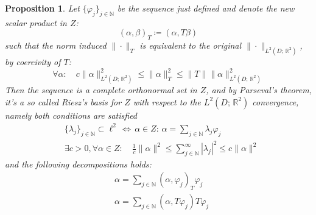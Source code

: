 \documentclass[10pt, a4paper, twoside, openright]{book}
\theoremstyle{definition}
\theoremstyle{plain}
\theoremstyle{plain}
\theoremstyle{plain}
\newtheorem{proposition}[subsection]{Proposition}
\theoremstyle{plain}
\theoremstyle{plain}
\theoremstyle{plain}
\theoremstyle{plain}
\theoremstyle{plain}
\let\phi\varphi
\begin{document}
\begin{proposition}
 Let $\{\phi_j\}_{j\in\mathbb{N}}$ be the sequence just defined and denote the new scalar product in $Z$:
 \begin{equation}
   ( \alpha, \beta )_T \coloneqq ( \alpha , T\beta)   
 \end{equation}
 such that the norm induced $\|\cdot\|_T$ is equivalent to the original $\|\cdot\|_{L^2(D;\,\mathbb{R}^2)}$, by coercivity of $T$: 
  \begin{equation}
   \forall \alpha:\quad c\|\alpha\|_{L^2(D;\,\mathbb{R}^2)}^2\leq \|\alpha\|_T^2 \leq \|T\|\|\alpha\|_{L^2(D;\,\mathbb{R}^2)}^2
  \end{equation}
 Then the sequence is a complete orthonormal set in $Z$, and by Parseval's theorem, it's a so called Riesz's basis for $Z$ with respect to the $L^2(D;\,\mathbb{R}^2)$ convergence, namely both conditions are satisfied
 \begin{align}
 &\{\lambda_j\}_{j \in \mathbb{N}} \subset \ell^2 \,\Leftrightarrow \,\alpha \in Z:\,\alpha = \sum_{j \in \mathbb{N}}\lambda_j \phi_j \\
 & \exists c>0, \forall \alpha \in Z: \quad \frac{1}{c}\|\alpha\|^2 \leq \sum_{j\in\mathbb{N}}^\infty|\lambda_j|^2  \leq c \|\alpha\|^2
 \end{align}
 and the following decompositions holds:
 \begin{align}
  & \alpha = \sum_{j \in \mathbb{N}}(\alpha,\phi_j)_T \phi_j  \\
  & \alpha = \sum_{j \in \mathbb{N}}(\alpha,T\phi_j) T\phi_j  
 \end{align}
\end{proposition}
\end{document}
